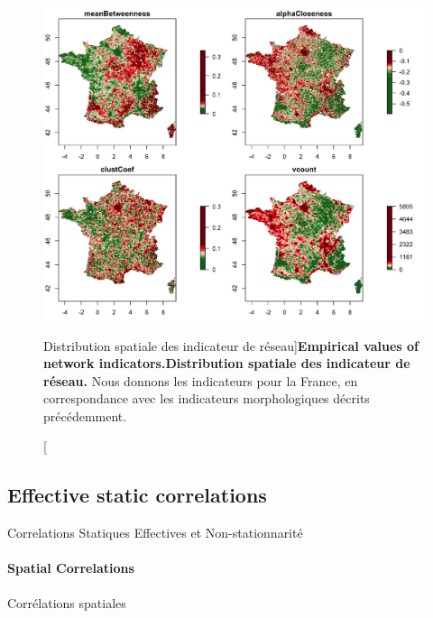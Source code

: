 \begin{figure}[h!]
\includegraphics[width=\linewidth]{Figures/StaticCorrelations/FR_indics_network_selected_2_discrquantiles}
\caption[Empirical values of network indicators][Distribution spatiale des indicateur de réseau]{\textbf{Empirical values of network indicators.}}{\textbf{Distribution spatiale des indicateur de réseau.} Nous donnons les indicateurs pour la France, en correspondance avec les indicateurs morphologiques décrits précédemment.}
\label{fig:staticcorrs:network}
\end{figure}





\subsection{Effective static correlations}{Correlations Statiques Effectives et Non-stationnarité}





\paragraph{Spatial Correlations}{Corrélations spatiales}


